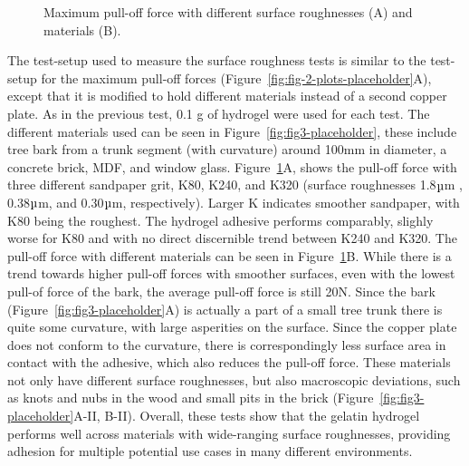 \begin{figure}
\centering
  \caption{Maximum pull-off force with different surface roughnesses (A) and materials (B).}
  \label{fig:fig-plot-surfaces}

\end{figure}

The test-setup used to measure the surface roughness tests is similar to the test-setup for the maximum pull-off forces (Figure~\ref{fig:fig-2-plots-placeholder}A), except that it is modified to hold different materials instead of a second copper plate. As in the previous test, 0.1 g of hydrogel were used for each test. The different materials used can be seen in Figure~\ref{fig:fig3-placeholder}, these include tree bark from a trunk segment (with curvature) around 100mm in diameter, a concrete brick, MDF, and window glass. Figure~\ref{fig:fig-plot-surfaces}A, shows the pull-off force with three different sandpaper grit, K80, K240, and K320 (surface roughnesses 1.8$\micro$m , 0.38$\micro$m, and 0.30$\micro$m, respectively). Larger K indicates smoother sandpaper, with K80 being the roughest. The hydrogel adhesive performs comparably, slighly worse for K80 and with no direct discernible trend between K240 and K320. The pull-off force with different materials can be seen in Figure~\ref{fig:fig-plot-surfaces}B. While there is a trend towards higher pull-off forces with smoother surfaces, even with the lowest pull-of force of the bark, the average pull-off force is still 20N. Since the bark (Figure~\ref{fig:fig3-placeholder}A) is actually a part of a small tree trunk there is quite some curvature, with large asperities on the surface. Since the copper plate does not conform to the curvature, there is correspondingly less surface area in contact with the adhesive, which also reduces the pull-off force. These materials not only have different surface roughnesses, but also macroscopic deviations, such as knots and nubs in the wood and small pits in the brick (Figure~\ref{fig:fig3-placeholder}A-II, B-II). Overall, these tests show that the gelatin hydrogel performs well across materials with wide-ranging surface roughnesses, providing adhesion for multiple potential use cases in many different environments. 


